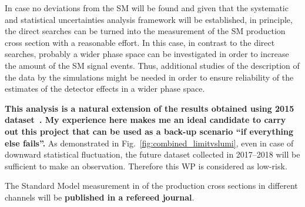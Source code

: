 In case no deviations from the SM will be found and given that the systematic and statistical uncertainties analysis framework will be established, in principle, the direct searches can be turned into the measurement of the SM \fourtop production cross section with a reasonable effort. In this case, in contrast to the direct searches, probably a wider phase space can be investigated in order to increase the amount of the SM signal \fourtop events. Thus, additional studies of the description of the data by the simulations might be needed in order to ensure reliability of the estimates of the detector effects in a wider phase space. 

\textbf{This analysis is a natural extension of the results obtained using 2015 dataset~\cite{CMS:2016wig}. My experience here makes me an ideal candidate to carry out this project that can be used as a back-up scenario ``if everything else fails''.} As demonstrated in Fig.~\ref{fig:combined_limitvslumi}, even in case of downward statistical fluctuation, the future dataset collected in 2017--2018 will be sufficient to make an observation. Therefore this WP is considered as low-risk.

The Standard Model measurement in of the \fourtop production cross sections in different channels will be \textbf{published in a refereed journal}.